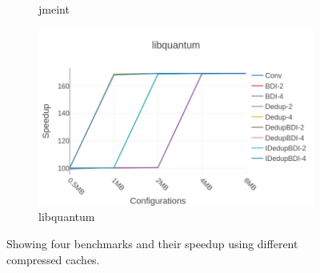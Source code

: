 \begin{figure}
\begin{subfigure}{0.5\textwidth}
        \caption{jmeint}
    \end{subfigure}
    \begin{subfigure}{0.5\textwidth}
        \includegraphics[width=\textwidth]{libquantum-speedup.png}
        \caption{libquantum}
    \end{subfigure}
    \caption[Case Study: Speedup]{Showing four benchmarks and their speedup using different compressed caches.}
    \label{fig:case_speedup}
\end{figure}

